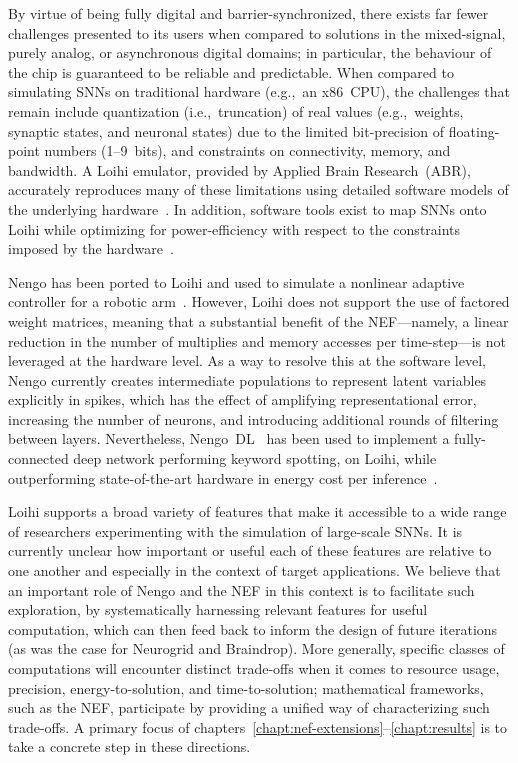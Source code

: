 By virtue of being fully digital and barrier-synchronized, there exists far fewer challenges presented to its users when compared to solutions in the mixed-signal, purely analog, or asynchronous digital domains; in particular, the behaviour of the chip is guaranteed to be reliable and predictable.
When compared to simulating SNNs on traditional hardware (e.g.,~an x86~CPU), the challenges that remain include quantization (i.e.,~truncation) of real values (e.g.,~weights, synaptic states, and neuronal states) due to the limited bit-precision of floating-point numbers (1--9~bits), and constraints on connectivity, memory, and bandwidth.
A Loihi emulator, provided by Applied Brain Research~(ABR), accurately reproduces many of these limitations using detailed software models of the underlying hardware~\citep{blouw2018a}.
In addition, software tools exist to map SNNs onto Loihi while optimizing for power-efficiency with respect to the constraints imposed by the hardware~\citep{lin2018programming, lin2018mapping}.

Nengo has been ported to Loihi and used to simulate a nonlinear adaptive controller for a robotic arm~\citep[][and personal communication]{dewolf2016}.
However, Loihi does not support the use of factored weight matrices, meaning that a substantial benefit of the NEF---namely, a linear reduction in the number of multiplies and memory accesses per time-step---is not leveraged at the hardware level.
As a way to resolve this at the software level, Nengo currently creates intermediate populations to represent latent variables explicitly in spikes, which has the effect of amplifying representational error, increasing the number of neurons, and introducing additional rounds of filtering between layers.
Nevertheless, Nengo~DL~\citep{rasmussen2018nengodl} has been used to implement a fully-connected deep network performing keyword spotting, on Loihi, while outperforming state-of-the-art hardware in energy cost per inference~\citep{blouw2018a}.


Loihi supports a broad variety of features that make it accessible to a wide range of researchers experimenting with the simulation of large-scale SNNs.
It is currently unclear how important or useful each of these features are relative to one another and especially in the context of target applications.
We believe that an important role of Nengo and the NEF in this context is to facilitate such exploration, by systematically harnessing relevant features for useful computation, which can then feed back to inform the design of future iterations (as was the case for Neurogrid and Braindrop).
More generally, specific classes of computations will encounter distinct trade-offs when it comes to resource usage, precision, energy-to-solution, and time-to-solution; mathematical frameworks, such as the NEF, participate by providing a unified way of characterizing such trade-offs.
A primary focus of chapters~\ref{chapt:nef-extensions}--\ref{chapt:results} is to take a concrete step in these directions.

